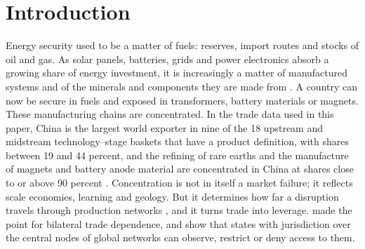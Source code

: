 \section{Introduction}\label{sec:intro}

Energy security used to be a matter of fuels: reserves, import routes and stocks of oil and gas.
As solar panels, batteries, grids and power electronics absorb a growing share of energy
investment, it is increasingly a matter of manufactured systems and of the minerals and components
they are made from \citep{carey2025secure, iea2024etp}. A country can now be secure in fuels and
exposed in transformers, battery materials or magnets. These manufacturing chains are
concentrated. In the trade data used in this paper, China is the largest world exporter in nine of
the 18 upstream and midstream technology--stage baskets that have a product definition, with
shares between 19 and 44 percent, and the refining of rare earths and the manufacture of magnets
and battery anode material are concentrated in China at shares close to or above 90 percent
\citep{iea2025gcmo, iea2026etp}. Concentration is not in itself a market failure; it reflects
scale economies, learning and geology. But it determines how far a disruption travels through
production networks \citep{acemoglu2012network, carvalho2021supply, baqaee2019macroeconomic},
and it turns trade into leverage. \citet{hirschman1945national} made the point for bilateral trade
dependence, and \citet{farrell2019weaponized} show that states with jurisdiction over the central
nodes of global networks can observe, restrict or deny access to them.

